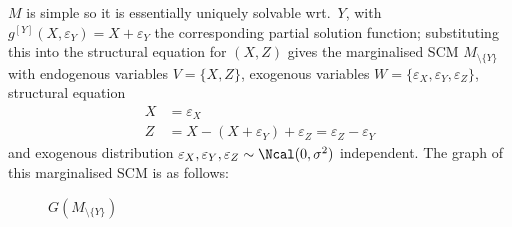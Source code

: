 \begin{enumerate}[label=10.\arabic*]
\begin{ungradedsolution}
        $M$ is simple so it is essentially uniquely solvable wrt.\ $Y$, with $g^{[Y]}(X, \varepsilon_Y) = X + \varepsilon_Y$ the corresponding partial solution function; substituting this into the structural equation for $(X, Z)$ gives the marginalised SCM $M_{\setminus \{Y\}}$ with endogenous variables $V = \{X, Z\}$, exogenous variables $W = \{\varepsilon_X, \varepsilon_Y, \varepsilon_Z\}$, structural equation
        \begin{align*}
            X & = \varepsilon_X                                                           \\
            Z & = X - (X + \varepsilon_Y) + \varepsilon_Z = \varepsilon_Z - \varepsilon_Y
        \end{align*}
        and exogenous distribution $\varepsilon_X, \varepsilon_Y, \varepsilon_Z \sim \Ncal(0, \sigma^2)$ independent. The graph of this marginalised SCM is as follows:
        \begin{figure}[!htb]
            \centering
            \caption{$G(M_{\setminus \{Y\}})$}
        \end{figure}
    \end{ungradedsolution}


\end{enumerate}
